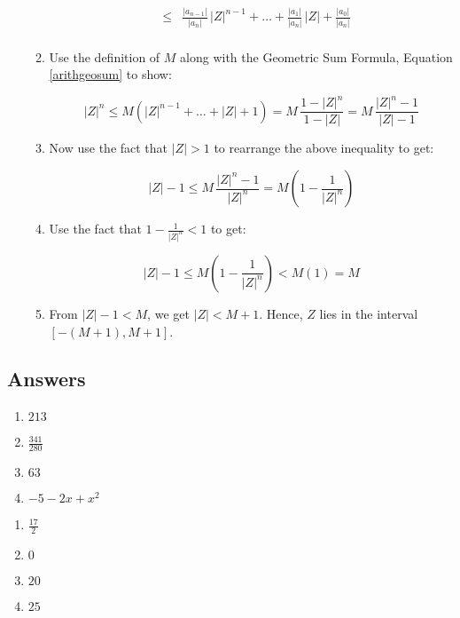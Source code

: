 \begin{enumerate}
\begin{enumerate}
\[\begin{array}{rcl}
 & \leq &  \frac{|a_{n-1}|}{|a_{n}|} \, |Z|^{n-1} + \ldots + \frac{|a_{1}|}{|a_{n}|} \, |Z| + \frac{|a_{0}|}{|a_{n}|} \\ \end{array} \]

\item  Use the definition of  $M$  along with the Geometric Sum Formula, Equation \ref{arithgeosum} to show:

\[ |Z|^{n} \leq M \left( |Z|^{n-1} + \ldots + |Z| + 1\right) = M \, \dfrac{1 - |Z|^n}{1 - |Z|} =  M \,  \dfrac{ |Z|^n - 1}{|Z| - 1} \]

\item  Now use the fact that $|Z| > 1$ to rearrange the above inequality to get:

\[ |Z| - 1 \leq M \, \dfrac{|Z|^{n} - 1}{|Z|^n} = M \left( 1 - \frac{1}{|Z|^n} \right) \]

\item  Use the fact that $1 - \frac{1}{|Z|^n} < 1$ to get:  

\[ |Z| - 1 \leq  M \left( 1 - \frac{1}{|Z|^n} \right)  < M (1) = M\]

\item  From $|Z| - 1 < M$, we get $|Z| < M+1$.  Hence, $Z$ lies in the interval  $\left[-(M+1), M+1\right]$.

\end{enumerate}



\end{enumerate}
\newpage

\subsection{Answers}

\begin{multicols}{4} 
\begin{enumerate}

\item $213$
\item $\frac{341}{280}$
\item $63$
\item $-5 - 2x + x^{2}$

\setcounter{HW}{\value{enumi}}
\end{enumerate}
\end{multicols}

\begin{multicols}{4} 
\begin{enumerate}
\setcounter{enumi}{\value{HW}}


\item $\frac{17}{2}$
\item $0$
\item  $20$
\item  $25$

\setcounter{HW}{\value{enumi}}
\end{enumerate}
\end{multicols}


